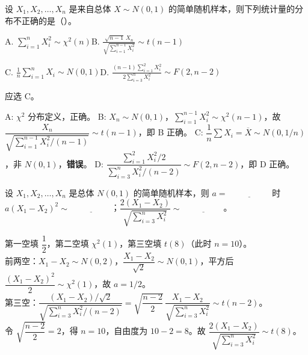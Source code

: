 \documentclass[lang=cn,11pt]{elegantbook}
\begin{document}
\begin{exercise}\label{exer:6-multi-harbin}
设 \(X_1, X_2, \dots, X_n\) 是来自总体 \(X \sim N(0,1)\) 的简单随机样本，则下列统计量的分布不正确的是（\quad）。\par
A. \(\displaystyle\sum_{i=1}^{n}X_i^2 \sim \chi^2(n)\)\qquad B. \(\displaystyle\frac{\sqrt{n-1}\,X_n}{\sqrt{\sum_{i=1}^{n-1}X_i^2}} \sim t(n-1)\)\par
C. \(\displaystyle\frac{1}{n}\sum_{i=1}^{n}X_i \sim N(0,1)\)\qquad D. \(\displaystyle\frac{(n-1)\sum_{i=1}^{2}X_i^2}{2\sum_{i=3}^{n}X_i^2} \sim F(2,n-2)\)
\end{exercise}

\begin{solution}
应选 C。

A: \(\chi^2\) 分布定义，正确。
B: \(X_n \sim N(0,1)\)，\(\sum_{i=1}^{n-1}X_i^2 \sim \chi^2(n-1)\)，故 \(\dfrac{X_n}{\sqrt{\sum_{i=1}^{n-1}X_i^2/(n-1)}} \sim t(n-1)\)，即 B 正确。
C: \(\dfrac{1}{n}\sum X_i = \overline{X} \sim N(0, 1/n)\)，非 \(N(0,1)\)，\textbf{错误}。
D: \(\dfrac{\sum_{i=1}^{2}X_i^2/2}{\sum_{i=3}^{n}X_i^2/(n-2)} \sim F(2,n-2)\)，即 D 正确。
\end{solution}


\begin{exercise}\label{exer:6-multi-dist}
设 \(X_1, X_2, \dots, X_n\) 是总体 \(N(0,1)\) 的简单随机样本，则 \(a =\,\underline{\hspace{2cm}}\) 时 \(a(X_1-X_2)^2 \sim\,\underline{\hspace{2cm}}\)；\(\dfrac{2(X_1-X_2)}{\sqrt{\sum_{i=3}^{n}X_i^2}} \sim\,\underline{\hspace{2cm}}\)。
\end{exercise}
\begin{solution}
第一空填 \(\dfrac{1}{2}\)，第二空填 \(\chi^2(1)\)，第三空填 \(t(8)\)（此时 \(n=10\)）。\\
前两空：\(X_1-X_2 \sim N(0, 2)\)，\(\dfrac{X_1-X_2}{\sqrt{2}} \sim N(0,1)\)，平方后 \(\dfrac{(X_1-X_2)^2}{2} \sim \chi^2(1)\)，故 \(a = 1/2\)。\\
第三空：\(\dfrac{(X_1-X_2)/\sqrt{2}}{\sqrt{\sum_{i=3}^{n}X_i^2/(n-2)}} = \sqrt{\dfrac{n-2}{2}}\,\dfrac{X_1-X_2}{\sqrt{\sum_{i=3}^{n}X_i^2}} \sim t(n-2)\)。\\
令 \(\sqrt{\dfrac{n-2}{2}} = 2\)，得 \(n = 10\)，自由度为 \(10-2 = 8\)。故 \(\dfrac{2(X_1-X_2)}{\sqrt{\sum_{i=3}^{n}X_i^2}} \sim t(8)\)。
\end{solution}
\end{document}
